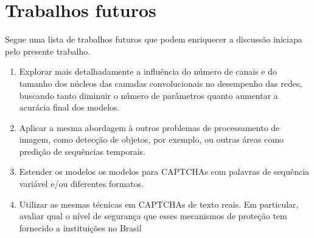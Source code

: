 \section{Trabalhos futuros}

Segue uma lista de trabalhos futuros que podem enriquecer a discussão iniciapa pelo presente trabalho.

\begin{enumerate}
	\item Explorar mais detalhadamente a influência do número de canais e do tamanho dos núcleos das camadas convolucionais no desempenho das redes, buscando tanto diminuir o número de parâmetros quanto aumentar a acurácia final dos modelos.
	\item Aplicar a mesma abordagem à outros problemas de processamento de imagem, como detecção de objetos, por exemplo, ou outras áreas como predição de sequências temporais.
	\item Estender os modelos os modelos para CAPTCHAs com palavras de sequência variável e/ou diferentes formatos.
	\item Utilizar as mesmas técnicas em CAPTCHAs de texto reais. Em particular, avaliar qual o nível de segurança que esses mecanismos de proteção tem fornecido a instituições no Brasil  
\end{enumerate}
